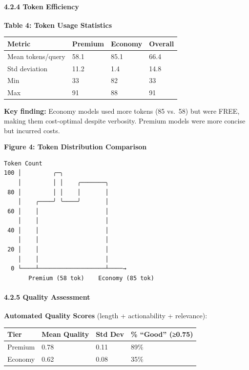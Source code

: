 \documentclass[
]{article}
\begin{document}
\hypertarget{token-efficiency}{%
\paragraph{4.2.4 Token Efficiency}\label{token-efficiency}}

\textbf{Table 4: Token Usage Statistics}

\begin{longtable}[]{@{}llll@{}}
\toprule
Metric & Premium & Economy & Overall \\
\midrule
\endhead
Mean tokens/query & 58.1 & 85.1 & 66.4 \\
Std deviation & 11.2 & 1.4 & 14.8 \\
Min & 33 & 82 & 33 \\
Max & 91 & 88 & 91 \\
\bottomrule
\end{longtable}

\textbf{Key finding:} Economy models used more tokens (85 vs.~58) but
were FREE, making them cost-optimal despite verbosity. Premium models
were more concise but incurred costs.

\textbf{Figure 4: Token Distribution Comparison}

\begin{verbatim}
Token Count
100 │         ╭─╮
    │         │ │    ╭───────╮
 80 │         │ │    │       │
    │    ╭────╯ ╰────╯       │
 60 │    │                   │
    │    │                   │
 40 │    │                   │
    │    │                   │
 20 │    │                   │
    │    │                   │
  0 └────┴───────────────────┴────→
       Premium (58 tok)    Economy (85 tok)
\end{verbatim}

\hypertarget{quality-assessment}{%
\paragraph{4.2.5 Quality Assessment}\label{quality-assessment}}

\textbf{Automated Quality Scores} (length + actionability + relevance):

\begin{longtable}[]{@{}llll@{}}
\toprule
Tier & Mean Quality & Std Dev & \% ``Good'' (≥0.75) \\
\midrule
\endhead
Premium & 0.78 & 0.11 & 89\% \\
Economy & 0.62 & 0.08 & 35\% \\
\bottomrule
\end{longtable}
\end{document}
